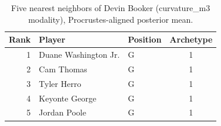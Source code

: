 \begin{table}[htbp]
  \centering\small
  \begin{tabular}{rllc}
    \toprule
    Rank & Player & Position & Archetype \\
    \midrule
    1 & Duane Washington Jr. & G & 1 \\
    2 & Cam Thomas & G & 1 \\
    3 & Tyler Herro & G & 1 \\
    4 & Keyonte George & G & 1 \\
    5 & Jordan Poole & G & 1 \\
    \bottomrule
  \end{tabular}
  \caption{Five nearest neighbors of Devin Booker (curvature_m3 modality), Procrustes-aligned posterior mean.}
  \label{tab:Devin_Booker_neighbors_curvature_m3}
\end{table}

